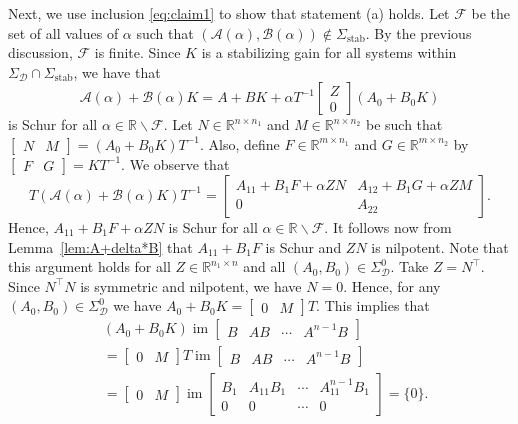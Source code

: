 \documentclass[9pt,shortpaper,twoside,web]{ieeecolor}
\DeclareMathOperator{\im}{im}
\begin{document}
Next, we use inclusion \eqref{eq:claim1} to show that statement (a) holds. Let $\mathcal{F}$ be the set of all values of $\alpha$ such that $(\mathcal{A}(\alpha),\mathcal{B}(\alpha))\notin\Sigma_\text{stab}$. By the previous discussion, $\mathcal{F}$ is finite. Since $K$ is a stabilizing gain for all systems within $\Sigma_\mathcal{D}\cap\Sigma_\text{stab}$, we have that
\begin{equation}
\label{eq:beforeSS-1}
\mathcal{A}(\alpha)+\mathcal{B}(\alpha)K=A+BK+\alpha T^{-1}\begin{bmatrix}
Z\\0
\end{bmatrix}(A_0+B_0K)
\end{equation}
is Schur for all $\alpha\in\mathbb{R}\backslash\mathcal{F}$. 
Let $N\in\mathbb{R}^{n\times n_1}$ and \mbox{$M\in\mathbb{R}^{n\times n_2}$} be such that $\begin{bmatrix}
N & M
\end{bmatrix}=(A_0+B_0K)T^{-1}$. Also, define $F\in\mathbb{R}^{m\times n_1}$ and $G\in\mathbb{R}^{m\times n_2}$ by $\begin{bmatrix}
F & G
\end{bmatrix}=KT^{-1}$. We observe that
\begin{equation}
\label{eq:afterSS-1}
T(\mathcal{A}(\alpha)\!+\!\mathcal{B}(\alpha)K)T^{-1}\!\!=\!\!\begin{bmatrix}
    \!A_{11}\!+\!B_1F\!+\!\alpha Z N \!\!&\!\! \!A_{12}\!+\!B_1G\!+\!\alpha ZM \\
    0            \!\!&\!\! A_{22}
    \end{bmatrix}\!.
\end{equation}
Hence, $A_{11}+B_1F+\alpha Z N$ is Schur for all $\alpha\in\mathbb{R}\backslash\mathcal{F}$. It follows now from Lemma~\ref{lem:A+delta*B} that $A_{11}+B_1F$ is Schur and $ZN$ is nilpotent. Note that this argument holds for all \mbox{$Z\in\mathbb{R}^{n_1\times n}$} and all $(A_0,B_0)\in\Sigma_\mathcal{D}^0$. Take $Z=N^\top$. Since $N^\top N$ is symmetric and nilpotent, we have $N=0$. Hence, for any $(A_0,B_0)\in\Sigma_\mathcal{D}^0$ we have \mbox{$A_0+B_0K=\begin{bmatrix}
0 & M
\end{bmatrix}T$}. This implies that
\begin{equation}
\begin{split}
&(A_0+B_0K)\im\begin{bmatrix}
B & AB & \cdots & A^{n-1}B
\end{bmatrix}\\
&=\begin{bmatrix}
0 & M
\end{bmatrix}T\im\begin{bmatrix}
B & AB & \cdots & A^{n-1}B
\end{bmatrix}\\
&=\begin{bmatrix}
0 & M
\end{bmatrix}\im\begin{bmatrix}
B_1 & A_{11}B_1 & \cdots & A^{n-1}_{11}B_1 \\
0   & 0         & \cdots & 0
\end{bmatrix}=\{0\}.
\end{split}
\end{equation}
\end{document}
